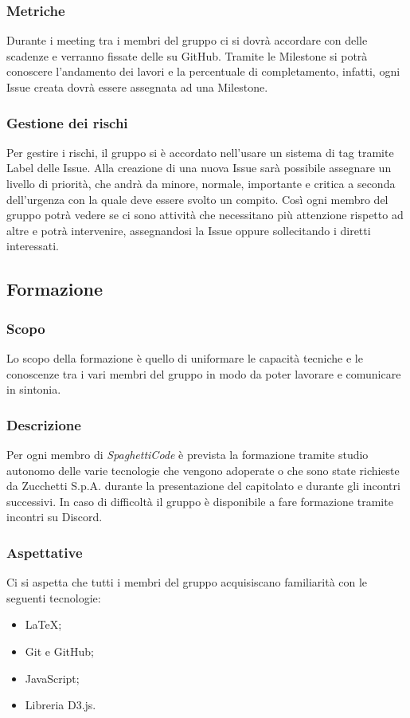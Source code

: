 \documentclass[../norme_di_progetto.tex]{subfiles}
\begin{document}
    \subsubsection{Metriche}
    Durante i meeting tra i membri del gruppo ci si dovrà accordare con delle scadenze e verranno fissate delle  su GitHub. Tramite le Milestone si potrà conoscere l'andamento dei lavori e la percentuale di completamento, infatti, ogni Issue creata dovrà essere assegnata ad una Milestone. 
    \subsubsection{Gestione dei rischi}
    Per gestire i rischi, il gruppo si è accordato nell'usare un sistema di tag tramite Label delle Issue. Alla creazione di una nuova Issue sarà possibile assegnare un livello di priorità, che andrà da minore, normale, importante e critica a seconda dell'urgenza con la quale deve essere svolto un compito. Così ogni membro del gruppo potrà vedere se ci sono attività che necessitano più attenzione rispetto ad altre e potrà intervenire, assegnandosi la Issue oppure sollecitando i diretti interessati.

\subsection{Formazione}
    \subsubsection{Scopo}
    Lo scopo della formazione è quello di uniformare le capacità tecniche e le conoscenze tra i vari membri del gruppo in modo da poter lavorare e comunicare in sintonia.
    \subsubsection{Descrizione}
    Per ogni membro di \emph{SpaghettiCode} è prevista la formazione tramite studio autonomo delle varie tecnologie che vengono adoperate o che sono state richieste da Zucchetti S.p.A. durante la presentazione del capitolato e durante gli incontri successivi. In caso di difficoltà il gruppo è disponibile a fare formazione tramite incontri su Discord.
    \subsubsection{Aspettative}
    Ci si aspetta che tutti i membri del gruppo acquisiscano familiarità con le seguenti tecnologie:
    \begin{itemize}
        \item \LaTeX;
        \item Git e GitHub;
        \item JavaScript;
        \item Libreria D3.js.
    \end{itemize}
\end{document}
